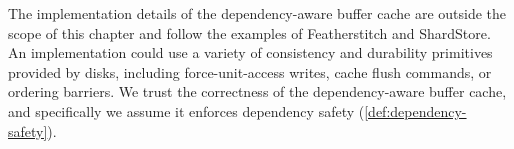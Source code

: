 The implementation details of the dependency-aware buffer cache
are outside the scope of this chapter and follow the examples of Featherstitch and ShardStore.
An implementation could use a variety of consistency and durability primitives provided by disks,
including force-unit-access writes, cache flush commands, or ordering barriers.
We trust the correctness of the dependency-aware buffer cache,
and specifically we assume it enforces dependency safety (\cref{def:dependency-safety}).






